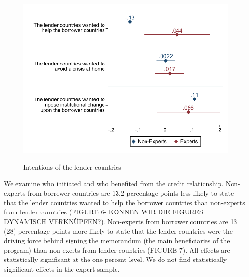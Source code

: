  \begin{figure}[H]
\begin{center}
     \caption{Intentions of the lender countries}
    
     \includegraphics[scale=0.8]{Question2_base.pdf}
     \label{fig:my_label}
      \end{center}
      \tiny
\end{figure}
We examine who initiated and who benefited from the credit relationship. 
Non-experts from borrower countries are 13.2 percentage points less likely to state that the lender countries wanted to help the borrower countries than non-experts from lender countries (FIGURE 6- KÖNNEN WIR DIE FIGURES DYNAMISCH VERKNÜPFEN?). Non-experts from borrower countries are 13 (28) percentage points more likely to state that the lender countries were the driving force behind signing the memorandum (the main beneficiaries of the program) than non-exerts from lender countries (FIGURE 7). All effects are statistically significant at the one percent level. We do not find statistically significant effects in the expert sample. \\
